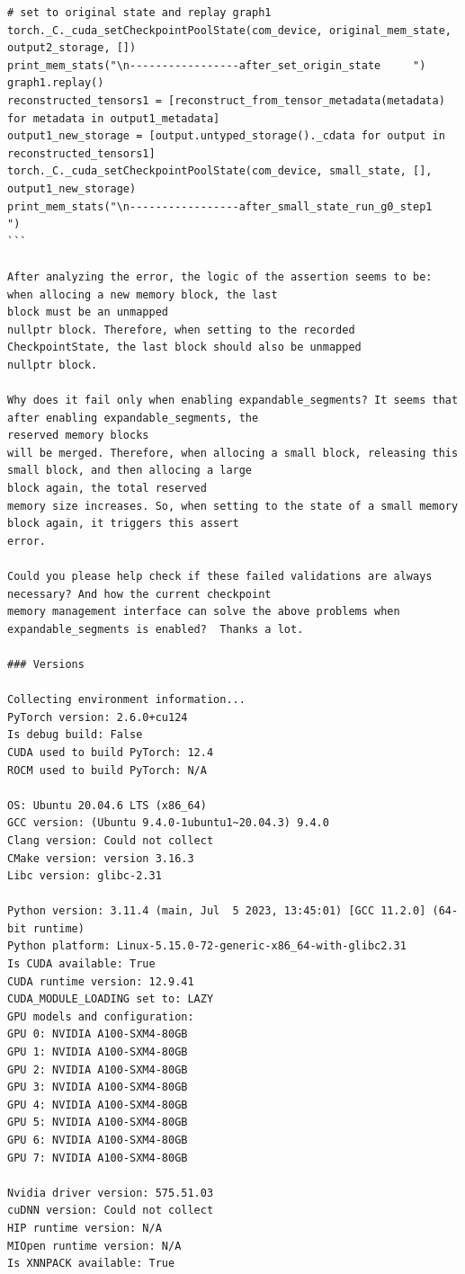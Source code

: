 \begin{tcolorbox}
\begin{verbatim}
# set to original state and replay graph1
torch._C._cuda_setCheckpointPoolState(com_device, original_mem_state, output2_storage, [])
print_mem_stats("\n-----------------after_set_origin_state     ")
graph1.replay()
reconstructed_tensors1 = [reconstruct_from_tensor_metadata(metadata) for metadata in output1_metadata]
output1_new_storage = [output.untyped_storage()._cdata for output in reconstructed_tensors1]
torch._C._cuda_setCheckpointPoolState(com_device, small_state, [], output1_new_storage)
print_mem_stats("\n-----------------after_small_state_run_g0_step1    ")
```

After analyzing the error, the logic of the assertion seems to be: when allocing a new memory block, the last
block must be an unmapped 
nullptr block. Therefore, when setting to the recorded CheckpointState, the last block should also be unmapped
nullptr block.

Why does it fail only when enabling expandable_segments? It seems that after enabling expandable_segments, the 
reserved memory blocks 
will be merged. Therefore, when allocing a small block, releasing this small block, and then allocing a large
block again, the total reserved 
memory size increases. So, when setting to the state of a small memory block again, it triggers this assert 
error.

Could you please help check if these failed validations are always necessary? And how the current checkpoint 
memory management interface can solve the above problems when expandable_segments is enabled?  Thanks a lot.

### Versions

Collecting environment information...
PyTorch version: 2.6.0+cu124
Is debug build: False
CUDA used to build PyTorch: 12.4
ROCM used to build PyTorch: N/A

OS: Ubuntu 20.04.6 LTS (x86_64)
GCC version: (Ubuntu 9.4.0-1ubuntu1~20.04.3) 9.4.0
Clang version: Could not collect
CMake version: version 3.16.3
Libc version: glibc-2.31

Python version: 3.11.4 (main, Jul  5 2023, 13:45:01) [GCC 11.2.0] (64-bit runtime)
Python platform: Linux-5.15.0-72-generic-x86_64-with-glibc2.31
Is CUDA available: True
CUDA runtime version: 12.9.41
CUDA_MODULE_LOADING set to: LAZY
GPU models and configuration:
GPU 0: NVIDIA A100-SXM4-80GB
GPU 1: NVIDIA A100-SXM4-80GB
GPU 2: NVIDIA A100-SXM4-80GB
GPU 3: NVIDIA A100-SXM4-80GB
GPU 4: NVIDIA A100-SXM4-80GB
GPU 5: NVIDIA A100-SXM4-80GB
GPU 6: NVIDIA A100-SXM4-80GB
GPU 7: NVIDIA A100-SXM4-80GB

Nvidia driver version: 575.51.03
cuDNN version: Could not collect
HIP runtime version: N/A
MIOpen runtime version: N/A
Is XNNPACK available: True

\end{verbatim}
\end{tcolorbox}

